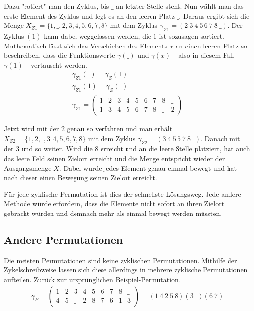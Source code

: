 \documentclass{fh-ium-bama}
\begin{document}
Dazu "rotiert" man den Zyklus, bis $\_$ an letzter Stelle steht. Nun wählt man das erste Element des Zyklus und legt es an den leeren Platz $\_$. 
Daraus ergibt sich die Menge $X_{Z1} = \{1, \_, 2, 3, 4, 5, 6, 7, 8\}$ mit dem Zyklus $\gamma_{Z1} = (2 ~ 3 ~ 4 ~ 5 ~ 6 ~ 7 ~ 8 ~ \_)$. Der Zyklus $(1)$ kann dabei weggelassen werden, die $1$ ist sozusagen sortiert.
Mathematisch lässt sich das Verschieben des Elements $x$ an einen leeren Platz so beschreiben, dass die Funktionswerte $\gamma(\_)$ und $\gamma(x)$ – also in diesem Fall $\gamma(1)$ – vertauscht werden.
\begin{gather*}
	\gamma_{Z1}(\_) = \gamma_Z(1)\\
	\gamma_{Z1}(1) = \gamma_Z(\_)\\
	\gamma_{Z1} =
	\begin{pmatrix}
		1 & 2 & 3 & 4 & 5 & 6 & 7 & 8 & \_ \\
		1 & 3 & 4 & 5 & 6 & 7 & 8 & \_ & 2
	\end{pmatrix}
\end{gather*}

Jetzt wird mit der $2$ genau so verfahren und man erhält $X_{Z2} = \{1, 2, \_, 3, 4, 5, 6, 7, 8\}$ mit dem Zyklus $\gamma_{Z2} = (3 ~ 4 ~ 5 ~ 6 ~ 7 ~ 8 ~ \_)$. Danach mit der $3$ und so weiter. Wird die $8$ erreicht und an die leere Stelle platziert, hat auch das leere Feld seinen Zielort erreicht und die Menge entspricht wieder der Ausgangsmenge $X$. Dabei wurde jedes Element genau einmal bewegt und hat nach dieser einen Bewegung seinen Zielort erreicht.

Für jede zyklische Permutation ist dies der schnellste Lösungsweg. Jede andere Methode würde erfordern, dass die Elemente nicht sofort an ihren Zielort gebracht würden und demnach mehr als einmal bewegt werden müssten.

\subsection{Andere Permutationen}
Die meisten Permutationen sind keine zyklischen Permutationen. Mithilfe der Zykelschreibweise lassen sich diese allerdings in mehrere zyklische Permutationen aufteilen. Zurück zur ursprünglichen Beispiel-Permutation.
\begin{gather*}
\gamma_P =
\begin{pmatrix}
	1 & 2 & 3 & 4 & 5 & 6 & 7 & 8 & \_ \\
	4 & 5 & \_ & 2 & 8 & 7 & 6 & 1 & 3
\end{pmatrix} =
(1 ~ 4 ~ 2 ~ 5 ~ 8)(3 ~ \_)(6 ~ 7)
\end{gather*}
\end{document}
